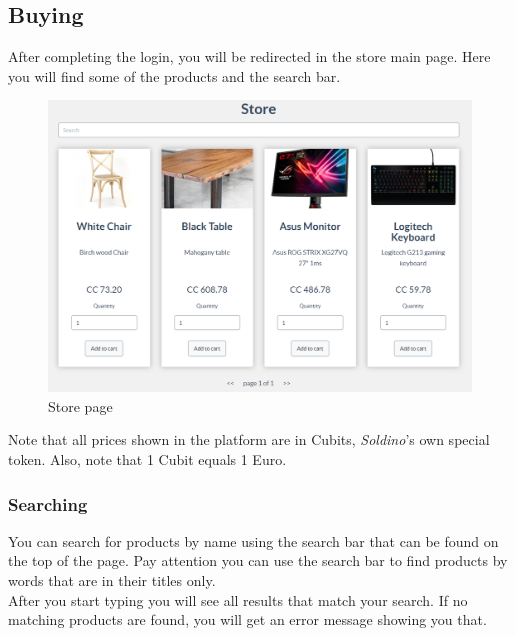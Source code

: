 	\subsection{Buying}
	After completing the login, you will be redirected in the store main page. 
	Here you will find some of the products and the search bar.
	\begin{figure}[H]
		\includegraphics[width=15cm]{res/images/store_main_page.png}
		\centering
		\caption{Store page}
	\end{figure}
	\noindent Note that all prices shown in the platform are in Cubits\glo{}, 
	\textit{Soldino}'s own special token. Also, note that 1 Cubit equals 1 Euro.
		\subsubsection{Searching}
		You can search for products by name using the search bar that can be 
		found on the top of the page. Pay attention you can use the search bar 
		to find products by words that are in their titles only. \\
		After you start typing you will see 
		all results that match your search. If no matching products are found, 
		you will get an error message showing you that.
%		
